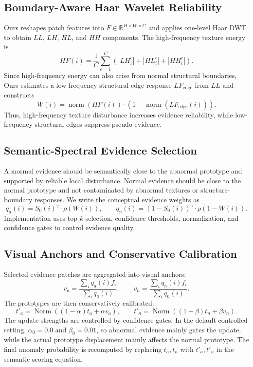 \documentclass[runningheads]{llncs}
\newcommand{\normop}{\operatorname{norm}}
\begin{document}
\subsection{Boundary-Aware Haar Wavelet Reliability}

Ours reshapes patch features into $F\in\mathbb{R}^{H\times W\times C}$ and applies one-level Haar DWT to obtain $LL$, $LH$, $HL$, and $HH$ components. The high-frequency texture energy is
\begin{equation}
HF(i)=\frac{1}{C}\sum_{c=1}^{C}\left(|LH_i^c|+|HL_i^c|+|HH_i^c|\right).
\end{equation}
Since high-frequency energy can also arise from normal structural boundaries, Ours estimates a low-frequency structural edge response $LF_{\mathrm{edge}}$ from $LL$ and constructs
\begin{equation}
W(i)=\normop(HF(i))\cdot\left(1-\normop(LF_{\mathrm{edge}}(i))\right).
\end{equation}
Thus, high-frequency texture disturbance increases evidence reliability, while low-frequency structural edges suppress pseudo evidence.

\subsection{Semantic-Spectral Evidence Selection}

Abnormal evidence should be semantically close to the abnormal prototype and supported by reliable local disturbance. Normal evidence should be close to the normal prototype and not contaminated by abnormal textures or structure-boundary responses. We write the conceptual evidence weights as
\begin{equation}
q_a(i)=S_0(i)^\gamma\cdot\rho(W(i)),\qquad
q_n(i)=(1-S_0(i))^\gamma\cdot\rho(1-W(i)).
\end{equation}
Implementation uses top-$k$ selection, confidence thresholds, normalization, and confidence gates to control evidence quality.

\subsection{Visual Anchors and Conservative Calibration}

Selected evidence patches are aggregated into visual anchors:
\begin{equation}
v_a=\frac{\sum_i q_a(i)f_i}{\sum_i q_a(i)},\qquad
v_n=\frac{\sum_i q_n(i)f_i}{\sum_i q_n(i)}.
\end{equation}
The prototypes are then conservatively calibrated:
\begin{equation}
t'_a=\operatorname{Norm}\left((1-\alpha)t_a+\alpha v_a\right),\qquad
t'_n=\operatorname{Norm}\left((1-\beta)t_n+\beta v_n\right).
\end{equation}
The update strengths are controlled by confidence gates. In the default controlled setting, $\alpha_0=0.0$ and $\beta_0=0.01$, so abnormal evidence mainly gates the update, while the actual prototype displacement mainly affects the normal prototype. The final anomaly probability is recomputed by replacing $t_a,t_n$ with $t'_a,t'_n$ in the semantic scoring equation.
\end{document}
